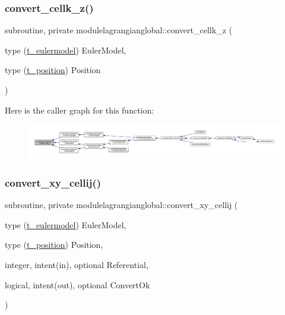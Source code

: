 \subsubsection{\texorpdfstring{convert\+\_\+cellk\+\_\+z()}{convert\_cellk\_z()}}
{\footnotesize\ttfamily subroutine, private modulelagrangianglobal\+::convert\+\_\+cellk\+\_\+z (\begin{DoxyParamCaption}\item[{type (\mbox{\hyperlink{structmodulelagrangianglobal_1_1t__eulermodel}{t\+\_\+eulermodel}})}]{Euler\+Model,  }\item[{type (\mbox{\hyperlink{structmodulelagrangianglobal_1_1t__position}{t\+\_\+position}})}]{Position }\end{DoxyParamCaption})\hspace{0.3cm}{\ttfamily [private]}}

Here is the caller graph for this function\+:\nopagebreak
\begin{figure}[H]
\begin{center}
\leavevmode
\includegraphics[width=350pt]{namespacemodulelagrangianglobal_ab7f2f6590a59e52fd0c30cdc7445acee_icgraph}
\end{center}
\end{figure}
\mbox{\label{namespacemodulelagrangianglobal_a713100b692a8ced1a6b27a0a1baa4039}} 
\subsubsection{\texorpdfstring{convert\+\_\+xy\+\_\+cellij()}{convert\_xy\_cellij()}}
{\footnotesize\ttfamily subroutine, private modulelagrangianglobal\+::convert\+\_\+xy\+\_\+cellij (\begin{DoxyParamCaption}\item[{type (\mbox{\hyperlink{structmodulelagrangianglobal_1_1t__eulermodel}{t\+\_\+eulermodel}})}]{Euler\+Model,  }\item[{type (\mbox{\hyperlink{structmodulelagrangianglobal_1_1t__position}{t\+\_\+position}})}]{Position,  }\item[{integer, intent(in), optional}]{Referential,  }\item[{logical, intent(out), optional}]{Convert\+Ok }\end{DoxyParamCaption})\hspace{0.3cm}{\ttfamily [private]}}

